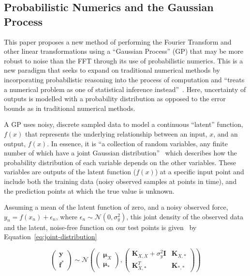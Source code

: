 \documentclass[12pt]{article}
\begin{document}
    \subsection{Probabilistic Numerics and the Gaussian Process}
    This paper proposes a new method of performing the Fourier Transform and other linear transformations using a ``Gaussian Process'' (GP) that may be more robust to noise than the FFT through its use of probabilistic numerics.
    This is a new paradigm that seeks to expand on traditional numerical methods by incorporating probabilistic reasoning into the process of computation and ``treats a numerical problem as one of statistical inference instead''~\cite{ProbabilisticNumerics2023}.
    Here, uncertainty of outputs is modelled with a probability distribution as opposed to the error bounds as in traditional numerical methods.

    A GP uses noisy, discrete sampled data to model a continuous ``latent'' function, $f(x)$ that represents the underlying relationship between an input, $x$, and an output, $f(x)$.
    In essence, it is ``a collection of random variables, any finite number of which have a joint Gaussian distribution''~\cite{rasmussen2006gaussian} which describes how the probability distribution of each variable depends on the other variables.
    These variables are outputs of the latent function ($f(x)$) at a specific input point and include both the training data (noisy observed samples at points in time), and the prediction points at which the true value is unknown.

    Assuming a mean of the latent function of zero, and a noisy observed force, $y_n = f(x_n)+\epsilon_n$, where $\epsilon_n \sim \mathcal{N}(0, \sigma^2_y)$, this joint density of the observed data and the latent, noise-free function on our test points is given~\cite{murphy2023probabilistic} by Equation~\ref{eq:joint-distribution}

    \begin{equation}
        \begin{pmatrix}
            \mathbf{y} \\
            \mathbf{f}^*
        \end{pmatrix}
        \sim \mathcal{N} \left(
        \begin{pmatrix}
            \boldsymbol{\mu}_X \\
            \boldsymbol{\mu}_*
        \end{pmatrix},
        \begin{pmatrix}
            \mathbf{K}_{X,X} + \sigma^2_y \mathbf{I} & \mathbf{K}_{X,*} \\
            \mathbf{K}_{X,*}^T & \mathbf{K}_{*,*}
        \end{pmatrix}
        \right)\label{eq:joint-distribution}
    \end{equation}
\end{document}
